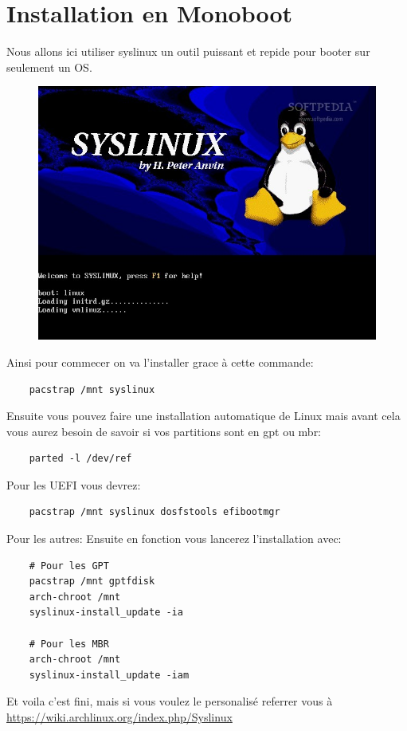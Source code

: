 \documentclass[a4paper]{book}
\begin{document}
  \section{Installation en Monoboot}
  Nous allons ici utiliser syslinux un outil puissant et repide pour booter sur
  seulement un OS.
  \begin{figure}[h]
    \includegraphics[width=\textwidth]{images/syslinux}
  \end{figure}
  Ainsi pour commecer on va l'installer grace à cette commande\@:\\
  \begin{lstlisting}
    pacstrap /mnt syslinux
  \end{lstlisting}
  Ensuite vous pouvez faire une installation automatique de Linux mais avant cela
  vous aurez besoin de savoir si vos partitions sont en gpt ou mbr\@:\\
  \begin{lstlisting}
    parted -l /dev/ref
  \end{lstlisting}
  Pour les UEFI vous devrez:
  \begin{lstlisting}
    pacstrap /mnt syslinux dosfstools efibootmgr
  \end{lstlisting}
  Pour les autres\@:
  Ensuite en fonction vous lancerez l'installation avec\@:\\
  \begin{lstlisting}
    # Pour les GPT
    pacstrap /mnt gptfdisk
    arch-chroot /mnt
    syslinux-install_update -ia
    
    # Pour les MBR
    arch-chroot /mnt
    syslinux-install_update -iam
  \end{lstlisting}
  Et voila c'est fini, mais si vous voulez le personalis\'e referrer vous à\\
  \url{https://wiki.archlinux.org/index.php/Syslinux}
\end{document}
